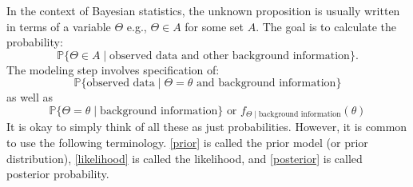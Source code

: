 \documentclass{scrartcl}
\newcommand{\P}{{\mathbb P}}
\begin{document}
In the context of Bayesian statistics, the unknown proposition is
usually written in terms of a variable $\Theta$ e.g., $\Theta \in
A$ for some set $A$. The goal is to calculate the probability:
\begin{equation}\label{posterior}
  \P \{\Theta \in A \mid \text{observed data and other background
    information}\}.
\end{equation}
The modeling step involves specification of:
\begin{equation}\label{likelihood}
  \P\{\text{observed data} \mid \Theta = \theta \text{ and background
    information} \}  
\end{equation}
as well as
\begin{equation}\label{prior}
  \P\{\Theta = \theta \mid \text{background information}\} \text{ or }
  f_{\Theta \mid \text{background information}}(\theta)
\end{equation}
It is okay to simply think of all these as just
probabilities. However, it is common to use the following
terminology. \eqref{prior} is called the prior model (or prior
distribution), \eqref{likelihood} is called the likelihood, and
\eqref{posterior} is called posterior probability. 
\end{document}
